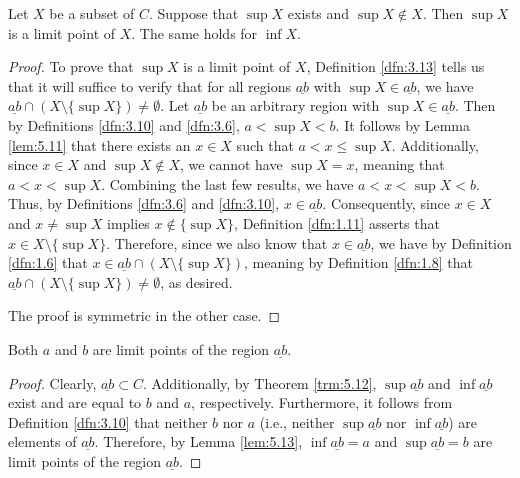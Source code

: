 \documentclass[../main.tex]{subfiles}
\begin{document}
\begin{lemma}\label{lem:5.13}
    Let $X$ be a subset of $C$. Suppose that $\sup X$ exists and $\sup X\notin X$. Then $\sup X$ is a limit point of $X$. The same holds for $\inf X$.
    \begin{proof}
        To prove that $\sup X$ is a limit point of $X$, Definition \ref{dfn:3.13} tells us that it will suffice to verify that for all regions $\underline{ab}$ with $\sup X\in\underline{ab}$, we have $\underline{ab}\cap(X\setminus\{\sup X\})\neq\emptyset$. Let $\underline{ab}$ be an arbitrary region with $\sup X\in\underline{ab}$. Then by Definitions \ref{dfn:3.10} and \ref{dfn:3.6}, $a<\sup X<b$. It follows by Lemma \ref{lem:5.11} that there exists an $x\in X$ such that $a<x\leq\sup X$. Additionally, since $x\in X$ and $\sup X\notin X$, we cannot have $\sup X=x$, meaning that $a<x<\sup X$. Combining the last few results, we have $a<x<\sup X<b$. Thus, by Definitions \ref{dfn:3.6} and \ref{dfn:3.10}, $x\in\underline{ab}$. Consequently, since $x\in X$ and $x\neq\sup X$ implies $x\notin\{\sup X\}$, Definition \ref{dfn:1.11} asserts that $x\in X\setminus\{\sup X\}$. Therefore, since we also know that $x\in\underline{ab}$, we have by Definition \ref{dfn:1.6} that $x\in\underline{ab}\cap(X\setminus\{\sup X\})$, meaning by Definition \ref{dfn:1.8} that $\underline{ab}\cap(X\setminus\{\sup X\})\neq\emptyset$, as desired.\par
        The proof is symmetric in the other case.
    \end{proof}
\end{lemma}

\begin{corollary}\label{cly:5.14}
    Both $a$ and $b$ are limit points of the region $\underline{ab}$.
    \begin{proof}
        Clearly, $\underline{ab}\subset C$. Additionally, by Theorem \ref{trm:5.12}, $\sup\underline{ab}$ and $\inf\underline{ab}$ exist and are equal to $b$ and $a$, respectively. Furthermore, it follows from Definition \ref{dfn:3.10} that neither $b$ nor $a$ (i.e., neither $\sup\underline{ab}$ nor $\inf\underline{ab}$) are elements of $\underline{ab}$. Therefore, by Lemma \ref{lem:5.13}, $\inf\underline{ab}=a$ and $\sup\underline{ab}=b$ are limit points of the region $\underline{ab}$.
    \end{proof}
\end{corollary}
\end{document}
